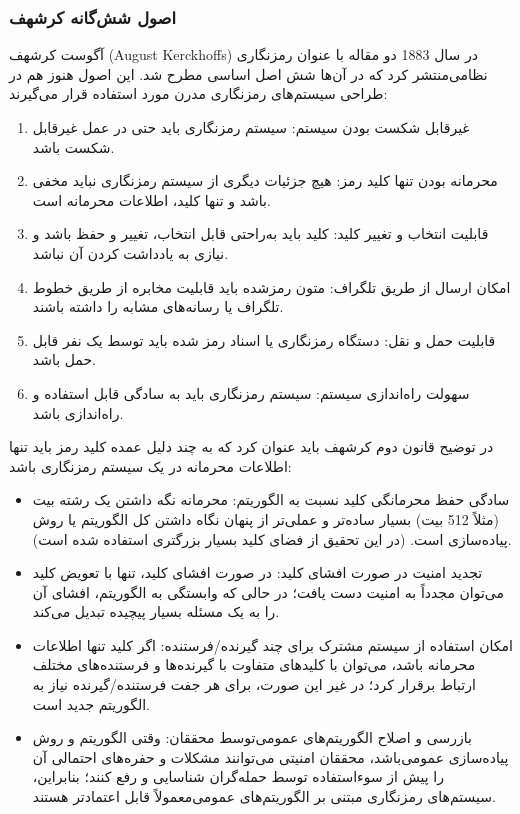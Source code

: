 \documentclass[a4paper,12pt]{report}
\renewcommand{\%}{\lr{\oldpercent}}
\providecommand{\lr}[1]{#1}
\begin{document}
\subsubsection{اصول شش‌گانه کرشهف}
آگوست کرشهف (\lr{August Kerckhoffs}) در سال 1883 دو مقاله با عنوان رمزنگاری نظامی‌منتشر کرد که در آن‌ها شش اصل اساسی مطرح شد. این اصول هنوز هم در طراحی سیستم‌های رمزنگاری مدرن مورد استفاده قرار می‌گیرند\cite{ref37}:

\begin{enumerate}
    \item غیرقابل شکست بودن سیستم: سیستم رمزنگاری باید حتی در عمل غیرقابل شکست باشد.
    \item محرمانه بودن تنها کلید رمز: هیچ جزئیات دیگری از سیستم رمزنگاری نباید مخفی باشد و تنها کلید، اطلاعات محرمانه است.
    \item قابلیت انتخاب و تغییر کلید: کلید باید به‌راحتی قابل انتخاب، تغییر و حفظ باشد و نیازی به یادداشت کردن آن نباشد.
    \item امکان ارسال از طریق تلگراف: متون رمزشده باید قابلیت مخابره از طریق خطوط تلگراف یا رسانه‌های مشابه را داشته باشند.
    \item قابلیت حمل و نقل: دستگاه رمزنگاری یا اسناد رمز شده باید توسط یک نفر قابل حمل باشد.
    \item سهولت راه‌اندازی سیستم: سیستم رمزنگاری باید به سادگی قابل استفاده و راه‌اندازی باشد.
\end{enumerate}

در توضیح قانون دوم کرشهف باید عنوان کرد که به چند دلیل عمده کلید رمز باید تنها اطلاعات محرمانه در یک سیستم رمزنگاری باشد:

\begin{itemize}
    \item سادگی حفظ محرمانگی کلید نسبت به الگوریتم: محرمانه نگه داشتن یک رشته بیت (مثلاً 512 بیت) بسیار ساده‌تر و عملی‌تر از پنهان نگاه داشتن کل الگوریتم یا روش پیاده‌سازی است. (در این تحقیق از فضای کلید بسیار بزرگتری استفاده شده است).
    \item تجدید امنیت در صورت افشای کلید: در صورت افشای کلید، تنها با تعویض کلید می‌توان مجدداً به امنیت دست یافت؛ در حالی که وابستگی به الگوریتم، افشای آن را به یک مسئله بسیار پیچیده تبدیل می‌کند.
    \item امکان استفاده از سیستم مشترک برای چند گیرنده/فرستنده: اگر کلید تنها اطلاعات محرمانه باشد، می‌توان با کلیدهای متفاوت با گیرنده‌ها و فرستنده‌های مختلف ارتباط برقرار کرد؛ در غیر این صورت، برای هر جفت فرستنده/گیرنده نیاز به الگوریتم جدید است.
    \item بازرسی و اصلاح الگوریتم‌های عمومی‌توسط محققان: وقتی الگوریتم و روش پیاده‌سازی عمومی‌باشد، محققان امنیتی می‌توانند مشکلات و حفره‌های احتمالی آن را پیش از سوءاستفاده توسط حمله‌گران شناسایی و رفع کنند؛ بنابراین، سیستم‌های رمزنگاری مبتنی بر الگوریتم‌های عمومی‌معمولاً قابل اعتمادتر هستند\cite{ref38}.
\end{itemize}
\end{document}
